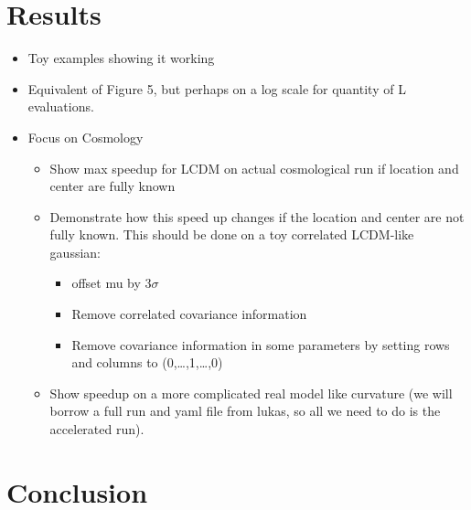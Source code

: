 \documentclass[usenatbib]{mnras}
\begin{document}
\section{Results}\label{sec:results}
\begin{itemize}
    \item Toy examples showing it working
    \item Equivalent of Figure 5, but perhaps on a log scale for quantity of L evaluations.
    \item Focus on Cosmology
        \begin{itemize}
            \item Show max speedup for LCDM on actual cosmological run if location and center are fully known
            \item Demonstrate how this speed up changes if the location and center are not fully known. This should be done on a toy correlated LCDM-like gaussian:
            \begin{itemize}
                \item offset mu by 3$\sigma$
                \item Remove correlated covariance information 
                \item Remove covariance information in some parameters by setting rows and columns to (0,\ldots,1,\ldots,0)
            \end{itemize}
        \item Show speedup on a more complicated real model like curvature (we will borrow a full run and yaml file from lukas, so all we need to do is the accelerated run).
        \end{itemize}
\end{itemize}

\section{Conclusion}\label{sec:conclusion}
\end{document}
